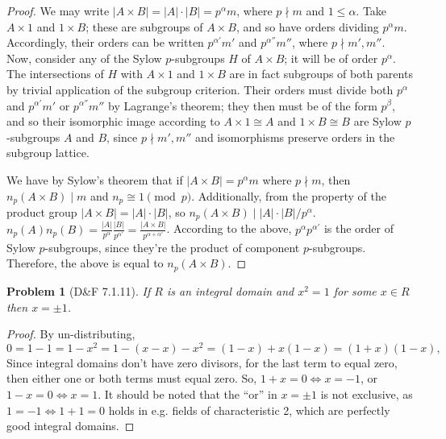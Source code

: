 \documentclass{article}
\newtheorem{problem}{Problem}
\begin{document}
\begin{proof}
  We may write $|A \times B| = |A| \cdot |B| = p^{\alpha}m$, where $p \nmid m$ and $1 \leq \alpha$.
  Take $A \times 1$ and $1 \times B$; these are subgroups of $A \times B$, and so have orders dividing $p^{\alpha}m$.
  Accordingly, their orders can be written $p^{\alpha'}m'$ and $p^{\alpha''}m''$, where $p \nmid m',m''$.
  Now, consider any of the Sylow $p$-subgroups $H$ of $A \times B$; it will be of order $p^{\alpha}$.
  The intersections of $H$ with $A \times 1$ and $1 \times B$ are in fact subgroups of both parents by trivial application of the subgroup criterion.
  Their orders must divide both $p^{\alpha}$ and $p^{\alpha'}m'$ or $p^{\alpha''}m'' $ by Lagrange's theorem; they then must be of the form $p^{\beta}$,
  and so their isomorphic image according to $A \times 1 \cong A$ and $1 \times B \cong B$ are Sylow $p$-subgroups $A$ and $B$,
  since $p \nmid m', m''$ and isomorphisms preserve orders in the subgroup lattice.

  We have by Sylow's theorem that if $|A \times B| = p^{\alpha}m$ where $p \nmid m$, then $n_{p}(A \times B) \mid m$ and $n_{p} \cong 1 \pmod p$.
  Additionally, from the property of the product group $|A \times B| = |A| \cdot |B|$, so $n_{p}(A \times B) \mid |A| \cdot |B| / p^{\alpha}$.
  $n_{p}(A)n_{p}(B) = \frac{|A|}{p^{\alpha}}\frac{|B|}{p^{\alpha'}} = \frac{|A \times B|}{p^{\alpha + \alpha'}}$.
  According to the above, $p^{\alpha}p^{\alpha'}$ is the order of Sylow $p$-subgroups, since they're the product of component $p$-subgroups.
  Therefore, the above is equal to $n_{p}(A \times B)$.

\end{proof}

\begin{problem}[D\&F 7.1.11]
  If $R$ is an integral domain and $x^{2} = 1$ for some $x \in R$ then $x = \pm 1$.
\end{problem}

\begin{proof}
  By un-distributing,
  \[
    0 = 1 - 1 = 1 - x^{2} = 1 - (x - x) - x^{2} = (1 - x) + x(1 - x) =  (1 + x)(1 - x),
  \]
  Since integral domains don't have zero divisors, for the last term to equal zero, then either one or both terms must equal zero.
  So, $1 + x = 0 \Leftrightarrow x = -1$, or $1 - x = 0 \Leftrightarrow x = 1$.
  It should be noted that the ``or'' in $x = \pm 1$ is not exclusive, as  $1 = -1 \Leftrightarrow 1 + 1 = 0$ holds in e.g. fields of characteristic 2,
  which are perfectly good integral domains.
\end{proof}
\end{document}
